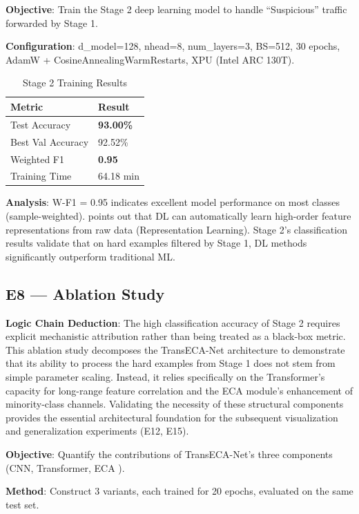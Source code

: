 \documentclass[sigconf]{acmart}
\begin{document}
\textbf{Objective}: Train the Stage 2 deep learning model to handle ``Suspicious'' traffic forwarded by Stage 1.

\textbf{Configuration}: d\_model=128, nhead=8, num\_layers=3, BS=512, 30 epochs, AdamW + CosineAnnealingWarmRestarts, XPU (Intel ARC 130T).

\begin{table}[H]
\caption{Stage 2 Training Results}
\label{tab:s2_results}
\begin{tabular}{ll}
\toprule
\textbf{Metric} & \textbf{Result} \\
\midrule
Test Accuracy & \textbf{93.00\%} \\
Best Val Accuracy & 92.52\% \\
Weighted F1 & \textbf{0.95} \\
Training Time & 64.18 min \\
\bottomrule
\end{tabular}
\end{table}

\textbf{Analysis}: W-F1 = 0.95 indicates excellent model performance on most classes (sample-weighted). \cite{5} points out that DL can automatically learn high-order feature representations from raw data (Representation Learning). Stage 2's classification results validate that on hard examples filtered by Stage 1, DL methods significantly outperform traditional ML.

\subsection{E8 --- Ablation Study}
\textbf{Logic Chain Deduction}: The high classification accuracy of Stage 2 requires explicit mechanistic attribution rather than being treated as a black-box metric. This ablation study decomposes the TransECA-Net architecture to demonstrate that its ability to process the hard examples from Stage 1 does not stem from simple parameter scaling. Instead, it relies specifically on the Transformer's capacity for long-range feature correlation and the ECA module's enhancement of minority-class channels. Validating the necessity of these structural components provides the essential architectural foundation for the subsequent visualization and generalization experiments (E12, E15).

\textbf{Objective}: Quantify the contributions of TransECA-Net's three components (CNN, Transformer, ECA \cite{23}).

\textbf{Method}: Construct 3 variants, each trained for 20 epochs, evaluated on the same test set.
\end{document}
